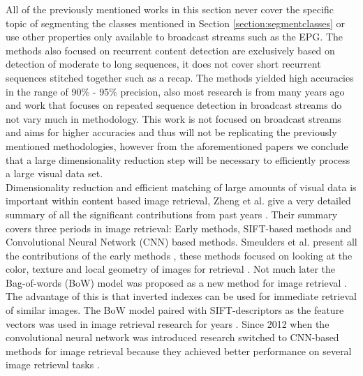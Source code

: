\documentclass{article}
\begin{document}
All of the previously mentioned works in this section never cover the specific topic of segmenting the classes mentioned in Section \ref{section:segmentclasses} or use other properties only available to broadcast streams such as the EPG. The methods also focused  on recurrent content detection are exclusively based on detection of moderate to long sequences, it does not cover short recurrent sequences stitched together such as a recap. The methods yielded high accuracies in the range of 90\% - 95\% precision, also most research is from many years ago and work that focuses on repeated sequence detection in broadcast streams do not vary much in methodology. This work is not focused on broadcast streams and aims for higher accuracies and thus will not be replicating the previously mentioned methodologies, however from the aforementioned papers we conclude that a large dimensionality reduction step will be necessary to efficiently process a large visual data set.
\\

Dimensionality reduction and efficient matching of large amounts of visual data is important within content based image retrieval, Zheng et al. give a very detailed summary of all the significant contributions from past years \cite{zheng2018sift}. Their summary covers three periods in image retrieval: Early methods, SIFT-based methods and Convolutional Neural Network (CNN) based methods. Smeulders et al. present all the contributions of the early methods \cite{smeulders2000content}, these methods focused on looking at the color, texture and local geometry of images for retrieval \cite{yu2002color,manjunath1996texture}. Not much later the Bag-of-words (BoW) model was proposed as a new method for image retrieval \cite{sivic2003video}. The advantage of this is that inverted indexes can be used for immediate retrieval of similar images. The BoW model paired with SIFT-descriptors \cite{lowe2004distinctive} as the feature vectors was used in image retrieval research for years \cite{nister2006scalable,philbin2007object,jegou2008hamming,jegou2010aggregating,jegou2012aggregating}. Since 2012 when the convolutional neural network was introduced \cite{krizhevsky2012imagenet} research switched to CNN-based methods for image retrieval because they achieved better performance on several image retrieval tasks	 \cite{babenko2014neural,yue2015exploiting, tolias2015particular}.


\iffalse
\cite{li2000automatic} %

\cite{lienhart1997detection} %
\cite{covell2006advertisement} %
\end{document}

